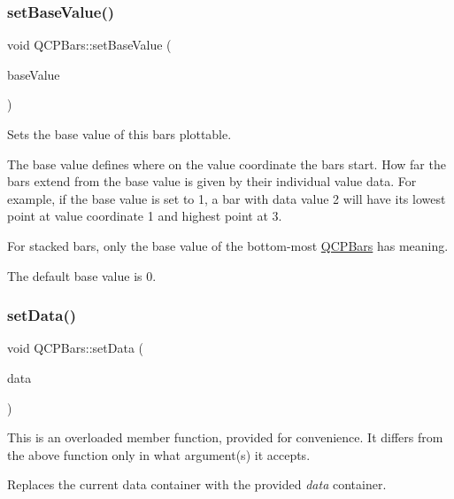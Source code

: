 \subsubsection{\texorpdfstring{set\+Base\+Value()}{setBaseValue()}}
{\footnotesize\ttfamily void Q\+C\+P\+Bars\+::set\+Base\+Value (\begin{DoxyParamCaption}\item[{double}]{base\+Value }\end{DoxyParamCaption})}

Sets the base value of this bars plottable.

The base value defines where on the value coordinate the bars start. How far the bars extend from the base value is given by their individual value data. For example, if the base value is set to 1, a bar with data value 2 will have its lowest point at value coordinate 1 and highest point at 3.

For stacked bars, only the base value of the bottom-\/most \hyperlink{classQCPBars}{Q\+C\+P\+Bars} has meaning.

The default base value is 0. \mbox{\label{classQCPBars_a6dc562ec7120a8521e1061f2134367e4}} 
\subsubsection{\texorpdfstring{set\+Data()}{setData()}\hspace{0.1cm}{\footnotesize\ttfamily [1/2]}}
{\footnotesize\ttfamily void Q\+C\+P\+Bars\+::set\+Data (\begin{DoxyParamCaption}\item[{Q\+Shared\+Pointer$<$ \hyperlink{classQCPDataContainer}{Q\+C\+P\+Bars\+Data\+Container} $>$}]{data }\end{DoxyParamCaption})}

This is an overloaded member function, provided for convenience. It differs from the above function only in what argument(s) it accepts.

Replaces the current data container with the provided {\itshape data} container.

